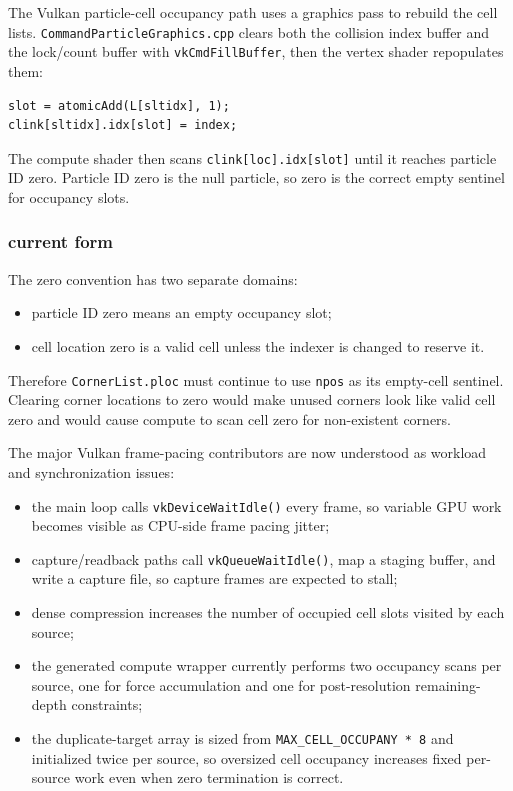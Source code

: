 The Vulkan particle-cell occupancy path uses a graphics pass to rebuild the
cell lists.  \texttt{CommandParticleGraphics.cpp} clears both the collision
index buffer and the lock/count buffer with \texttt{vkCmdFillBuffer}, then
the vertex shader repopulates them:
\begin{verbatim}
slot = atomicAdd(L[sltidx], 1);
clink[sltidx].idx[slot] = index;
\end{verbatim}
The compute shader then scans \texttt{clink[loc].idx[slot]} until it reaches
particle ID zero.  Particle ID zero is the null particle, so zero is the
correct empty sentinel for occupancy slots.

\subsubsection{current form}

The zero convention has two separate domains:
\begin{itemize}
    \item particle ID zero means an empty occupancy slot;
    \item cell location zero is a valid cell unless the indexer is changed to
          reserve it.
\end{itemize}
Therefore \texttt{CornerList.ploc} must continue to use \texttt{npos} as its
empty-cell sentinel.  Clearing corner locations to zero would make unused
corners look like valid cell zero and would cause compute to scan cell zero
for non-existent corners.

The major Vulkan frame-pacing contributors are now understood as workload
and synchronization issues:
\begin{itemize}
    \item the main loop calls \texttt{vkDeviceWaitIdle()} every frame, so
          variable GPU work becomes visible as CPU-side frame pacing jitter;
    \item capture/readback paths call \texttt{vkQueueWaitIdle()}, map a
          staging buffer, and write a capture file, so capture frames are
          expected to stall;
    \item dense compression increases the number of occupied cell slots
          visited by each source;
    \item the generated compute wrapper currently performs two occupancy
          scans per source, one for force accumulation and one for
          post-resolution remaining-depth constraints;
    \item the duplicate-target array is sized from
          \texttt{MAX\_CELL\_OCCUPANY * 8} and initialized twice per source,
          so oversized cell occupancy increases fixed per-source work even
          when zero termination is correct.
\end{itemize}

